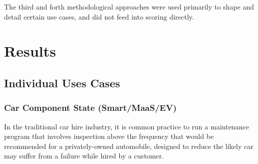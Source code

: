 \documentclass[b5paper,10pt]{article}
\begin{document}
The third and forth methodological approaches were used primarily to
shape and detail certain use cases, and did not feed into scoring
directly.

\section{Results}





\subsection{Individual Uses Cases}

\subsubsection{Car Component State (Smart/MaaS/EV)}

In the traditional car hire industry, it is common practice to run a
maintenance program that involves inspection above the frequency that
would be recommended for a privately-owned automobile, designed to
reduce the likely car may suffer from a failure while hired by a
customer.
\end{document}
